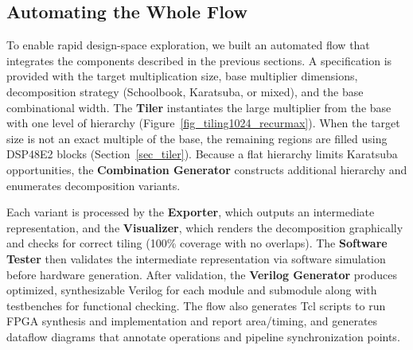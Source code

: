 \subsection{Automating the Whole Flow}
To enable rapid design-space exploration, we built an automated flow that integrates the components described in the previous sections.
A specification is provided with the target multiplication size, base multiplier dimensions, decomposition strategy (Schoolbook, Karatsuba, or mixed), and the base combinational width.
The \textbf{Tiler} instantiates the large multiplier from the base with one level of hierarchy (Figure~\ref{fig_tiling1024_recurmax}). 
When the target size is not an exact multiple of the base, the remaining regions are filled using DSP48E2 blocks (Section~\ref{sec_tiler}).
Because a flat hierarchy limits Karatsuba opportunities, the \textbf{Combination Generator} constructs additional hierarchy and enumerates decomposition variants.

Each variant is processed by the \textbf{Exporter}, which outputs an intermediate representation, and the \textbf{Visualizer}, which renders the decomposition graphically and checks for correct tiling (100\% coverage with no overlaps).
The \textbf{Software Tester} then validates the intermediate representation via software simulation before hardware generation.
After validation, the \textbf{Verilog Generator} produces optimized, synthesizable Verilog for each module and submodule along with testbenches for functional checking.
The flow also generates Tcl scripts to run FPGA synthesis and implementation and report area/timing, and generates dataflow diagrams that annotate operations and pipeline synchronization points.